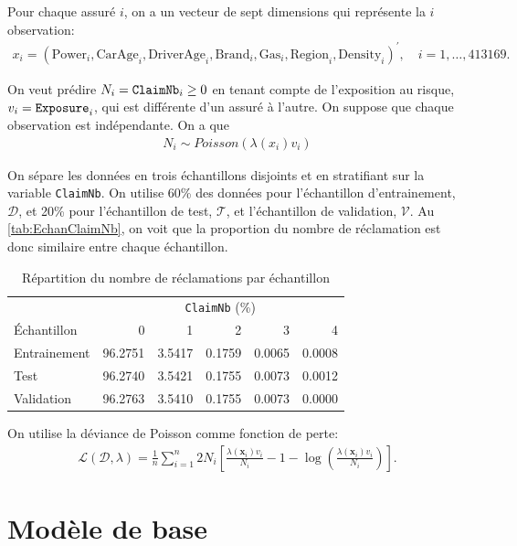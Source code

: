 Pour chaque assuré $i$, on a un vecteur de sept dimensions qui représente la $i$\ieme observation:
\begin{align*}
x_i = \left( \text{Power}_i, \text{CarAge}_i, \text{DriverAge}_i, \text{Brand}_i, \text{Gas}_i,
 \text{Region}_i, \text{Density}_i \right)^\prime,\quad i = 1,\dots, 413169.
\end{align*}

On veut prédire $N_i= \verb=ClaimNb=_i \geq 0$ en tenant compte de l'exposition au risque, $v_i = \verb=Exposure=_i $, qui est différente d'un assuré à l'autre. On suppose que chaque observation est indépendante. On a que
\begin{align*}
N_i \sim Poisson\left(\lambda(x_i)v_i\right)
\end{align*}

On sépare les données en trois échantillons disjoints et en stratifiant sur la variable \verb=ClaimNb=. On utilise 60\% des données pour l'échantillon d'entrainement, $\mathcal{D}$, et 20\%  pour l'échantillon de test, $\mathcal{T}$, et l'échantillon de validation, $\mathcal{V}$. Au \autoref{tab:EchanClaimNb}, on voit que la proportion du nombre de réclamation est donc similaire entre chaque échantillon.

\begin{table}[b]
\centering
\caption{\label{tab:EchanClaimNb} Répartition du nombre de réclamations par échantillon}
\begin{tabular}{lrrrrr}
\toprule
 & \multicolumn{5}{c}{ \Verb=ClaimNb= (\%)}\\
\cmidrule{2-6}
Échantillon & 0 & 1 & 2 & 3 & 4\\
\midrule
Entrainement & 96.2751 & 3.5417 & 0.1759 & 0.0065 & 0.0008\\
Test & 96.2740 & 3.5421 & 0.1755 & 0.0073 & 0.0012\\
Validation & 96.2763 & 3.5410 & 0.1755 & 0.0073 & 0.0000\\
\bottomrule
\end{tabular}
\end{table}

On utilise la déviance de Poisson comme fonction de perte:
\begin{align*}
\mathcal{L}(\mathcal{D}, \lambda)=\frac{1}{n} \sum_{i=1}^{n} 2 N_{i}\left[\frac{\lambda\left(\boldsymbol{x}_{i}\right) v_{i}}{N_{i}}-1-\log \left(\frac{\lambda\left(\boldsymbol{x}_{i}\right) v_{i}}{N_{i}}\right)\right].
\end{align*} 

\section{Modèle de base}
\label{sec:modèledebase}

